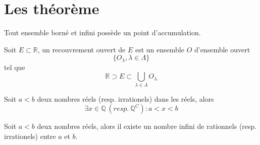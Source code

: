 \section{Les théorème}
	\begin{mythm}
		Tout ensemble borné et infini possède un point d'accumulation.
	\end{mythm}
	\begin{mythm}
		Soit $E\subset\mathbb{R}$, un recouvrement ouvert de $E$ est un ensemble $O$ d'ensemble ouvert \[\{O_{\lambda}, \lambda\in\Lambda\}\] tel que \[\mathbb{R}\supset E\subset \bigcup_{\lambda\in\Lambda}O_{\lambda}\]
	\end{mythm}
	\begin{mythm}
		Soit $a<b$ deux nombres réels (resp. irrationels) dans les réels, alors
		\[\exists x\in\mathbb{Q}~(resp.~\mathbb{Q}^C) : a<x<b\]
	\end{mythm}
	\begin{mythm}[Corolaire]
		Soit $a<b$ deux nombres réels, alors il existe un nombre infini de rationnels (resp. irrationels) entre $a$ et $b$.
	\end{mythm}